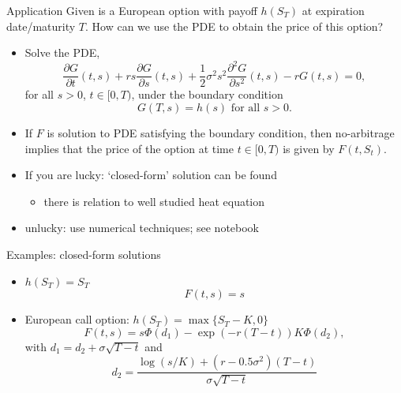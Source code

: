 \documentclass[pdf, handout]{beamer}
\begin{document}
\begin{frame}{Application}
Given is a European option with payoff $h(S_T)$ at expiration date/maturity $T$. How can we use the PDE to obtain the price of this option? 
\begin{itemize}
\item Solve the  PDE,
\[
\frac{\partial G}{\partial t}(t, s) + r s \frac{\partial G}{\partial
s}(t, s) + \frac{1}{2}\sigma^2 s^2 \frac{\partial^2 G}{\partial
s^2}(t,s) -r G(t,s )=0,
\]
for all $s>0$, $t\in[0,T)$,
under the boundary condition
\[
G(T,s)=h(s) \text{ for all } s>0.
\]
\item If $F$ is solution to PDE satisfying the boundary condition, then no-arbitrage implies that the price of the option at time $t\in [0, T)$ is given by $F(t, S_t)$.
\item If you are lucky: `closed-form' solution can be found
\begin{itemize}
\item there is relation to well studied  heat equation
\end{itemize}
\item unlucky:
use numerical techniques; see notebook
\end{itemize}
\end{frame}
%
\begin{frame}{Examples: closed-form solutions}
\begin{itemize}
\item $h(S_T)=S_T$
\[
F(t,s)=s
\]
\item European call option: $h(S_T)=\max\{ S_T-K,0\}$
\[
F(t,s)=s\Phi(d_1)-\exp(-r(T-t))K\Phi(d_2),
\]
with
$d_1=d_2+\sigma\sqrt{T-t}$ and
\[
d_2=\frac{
\log(s/K)+(r-0.5 \sigma^2)(T-t)}{\sigma\sqrt{T-t}}
\]
\end{itemize}
\end{frame}
%
\end{document}
